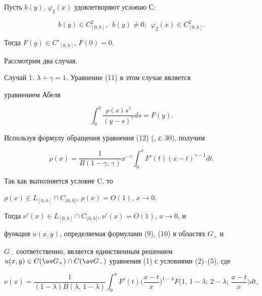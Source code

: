 Пусть $b(y)$, $\varphi_2(x)$ удовлетворяют {\it условию} С: 


$$ 


b(y)\in C^2_{[0,h]},\ \; b(y)\ne0;\ \; 


\varphi_2(x)\in C^2_{[0,h]}. 


$$ 


Тогда $F(y)\in C'_{[0,h]}$, $F(0)=0$. 


 


Рассмотрим два случая. 


\medskip 


 


Случай 1. $\lambda+\gamma=1$. Уравнение (11) в этом случае является 


уравнением Абеля 


\begin{equation} 


\int^y_0\frac{\rho(s)s^\gamma}{(y-s)^\gamma}ds=F(y). 


\end{equation} 


Используя формулу обращения уравнения (12) (\cite{3}, с.\,30), получим 


$$ 


\rho(x)=\frac{1}{B(1-\gamma,\,\gamma)}x^{-\gamma}\int^x_0 


F'(t)(x-t)^{\gamma-1}dt. 


$$ 


Так как выполняется условие C, то 


$\rho(x)\in L_{[0,h]}\cap C_{(0,h]}$, $\rho(x)=O(1)$, $x\to0$. 


Тогда $\nu'(x)\in L_{[0,h]}\cap C_{(0,h]}$, $\nu'(x)=O(1)$, $x\to0$, и 


функция $u(x,y)$, определяемая формулами (9), (10) в областях $G_+$ и 


$G_-$ соответственно, является единственным решением $u(x,y)\in C(\ov 


G_+)\cap C(\ov G_-)$ уравнения (1) с условиями (2)--(5), где 


\begin{equation} 


\nu(x)=\frac{1}{(1-\lambda)B(\lambda,\,1-\lambda)} 


\int^x_0 F'(t)\bigg(\frac{x-t}{x}\bigg)^{1-\lambda} 


F\bigg(1,\,1-\lambda;\,2-\lambda;\,\frac{x-t}{x}\bigg)dt, 


\end{equation} 


